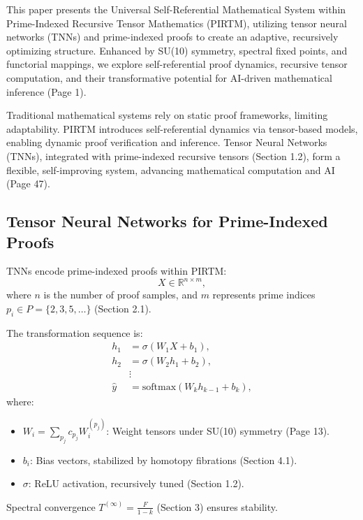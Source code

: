 \documentclass{article}
\theoremstyle{plain}
\begin{document}
This paper presents the Universal Self-Referential Mathematical System within Prime-Indexed Recursive Tensor Mathematics (PIRTM), utilizing tensor neural networks (TNNs) and prime-indexed proofs to create an adaptive, recursively optimizing structure. Enhanced by SU(10) symmetry, spectral fixed points, and functorial mappings, we explore self-referential proof dynamics, recursive tensor computation, and their transformative potential for AI-driven mathematical inference (Page 1).

Traditional mathematical systems rely on static proof frameworks, limiting adaptability. PIRTM introduces self-referential dynamics via tensor-based models, enabling dynamic proof verification and inference. Tensor Neural Networks (TNNs), integrated with prime-indexed recursive tensors (Section 1.2), form a flexible, self-improving system, advancing mathematical computation and AI (Page 47).

\subsection{Tensor Neural Networks for Prime-Indexed Proofs}
TNNs encode prime-indexed proofs within PIRTM:
\begin{equation}
X \in \mathbb{R}^{n \times m},
\end{equation}
where \( n \) is the number of proof samples, and \( m \) represents prime indices \( p_i \in P = \{2, 3, 5, \dots\} \) (Section 2.1).

The transformation sequence is:
\begin{align}
h_1 &= \sigma(W_1 X + b_1), \\
h_2 &= \sigma(W_2 h_1 + b_2), \\
&\vdots \\
\hat{y} &= \text{softmax}(W_k h_{k-1} + b_k),
\end{align}
where:
\begin{itemize}
    \item \( W_i = \sum_{p_j} c_{p_j} W_i^{(p_j)} \): Weight tensors under SU(10) symmetry (Page 13).
    \item \( b_i \): Bias vectors, stabilized by homotopy fibrations (Section 4.1).
    \item \( \sigma \): ReLU activation, recursively tuned (Section 1.2).
\end{itemize}
Spectral convergence \( T^{(\infty)} = \frac{F}{1 - k} \) (Section 3) ensures stability.
\end{document}
